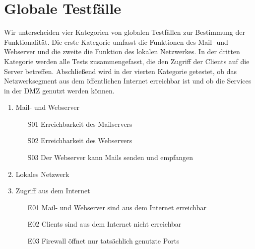 \section{Globale Testfälle}

Wir unterscheiden vier Kategorien von globalen Testfällen zur Bestimmung der Funktionalität. Die erste Kategorie umfasst die Funktionen des Mail- und Webserver und die zweite die Funktion des lokalen Netzwerkes. In der dritten Kategorie werden alle Tests zusammengefasst, die den Zugriff der Clients auf die Server betreffen. Abschließend wird in der vierten Kategorie getestet, ob das Netzwerksegment aus dem öffentlichen Internet erreichbar ist und ob die Services in der DMZ genutzt werden können.

\begin{enumerate}
	\item Mail- und Webserver
		\begin{itemize}
			\item[S01] Erreichbarkeit des Mailservers
			\item[S02] Erreichbarkeit des Webservers
			\item[S03] Der Webserver kann Mails senden und empfangen
		\end{itemize}
	\item Lokales Netzwerk 
	\item Zugriff aus dem Internet
		\begin{itemize}
			\item[E01] Mail- und Webserver sind aus dem Internet erreichbar 
			\item[E02] Clients sind aus dem Internet nicht erreichbar
			\item[E03] Firewall öffnet nur tatsächlich genutzte Ports 
		\end{itemize}
\end{enumerate}


